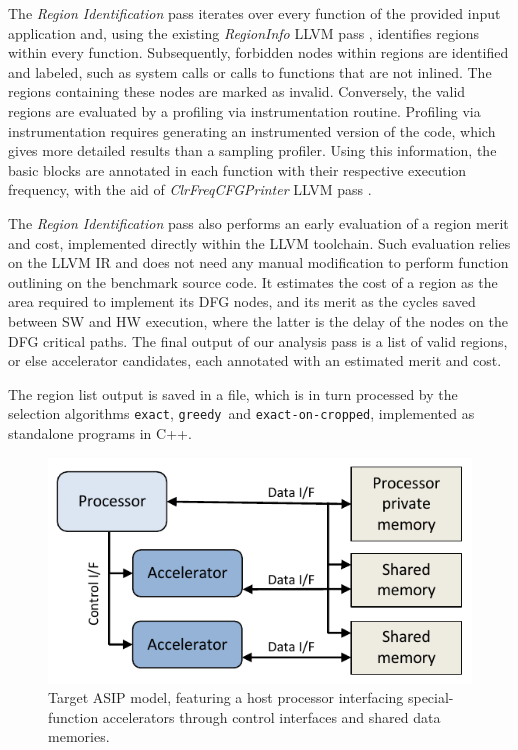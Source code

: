 \documentclass[]{usiinfthesis}
\newcommand{\exact}{\texttt{exact}}
\newcommand{\greedy}{\texttt{greedy}}
\newcommand{\exactC}{\texttt{exact-on-cropped}}
\begin{document}
The \emph{Region Identification} pass iterates over every function of the provided 
input application and, using the existing \emph{RegionInfo} LLVM pass 
\cite{GrosserApr12}, identifies regions within every function. Subsequently, 
forbidden nodes within regions are identified and labeled, such as system
calls or calls to functions that are not inlined. The regions containing
these nodes are marked as invalid. Conversely, the valid regions are 
evaluated by a profiling via instrumentation routine.
Profiling via
instrumentation requires generating an instrumented version of the
code, which gives more detailed results than a sampling
profiler. Using this information, the basic blocks are annotated
 in each function with their respective execution frequency, with the aid of \emph{ClrFreqCFGPrinter} LLVM pass \cite{ZacharopoulosMar17}.\par
 

The \emph{Region Identification} pass also performs an early evaluation of a region merit and cost, implemented directly within the LLVM toolchain. Such evaluation relies on the LLVM IR and does not need any manual modification to perform function outlining on the benchmark source code. It estimates the cost of a region as the area required to implement its DFG nodes, and its merit as the cycles saved between SW and HW execution, where the latter is the delay of the nodes on the DFG critical paths.
The final output of our analysis pass is a list of valid regions, or else accelerator candidates, each annotated with an estimated merit and cost.\par

The region list output is saved in a file, which is in turn processed by the 
selection algorithms \exact, \greedy\ and \exactC, implemented as standalone programs in C++.

\begin{figure}
\centering
\includegraphics[width= .6 \linewidth]{figs/platform.pdf}
\caption{Target ASIP model, featuring a host processor interfacing
  special-function accelerators through control interfaces and shared
  data memories.}
\label{fig:platform}
\end{figure}
\end{document}
